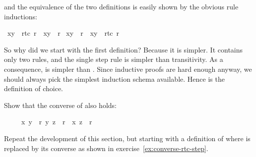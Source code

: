 \begin{isabellebody}
%
\begin{isamarkuptext}%
\noindent
and the equivalence of the two definitions is easily shown by the obvious rule
inductions:%
\end{isamarkuptext}%
\isamarkuptrue%
\ {\isachardoublequote}{\isacharparenleft}x{\isacharcomma}y{\isacharparenright}\ {\isasymin}\ rtc{}\ r\ {\isasymLongrightarrow}\ {\isacharparenleft}x{\isacharcomma}y{\isacharparenright}\ {\isasymin}\ r{\isacharasterisk}{\isachardoublequote}\isanewline
\isamarkupfalse%
\isamarkupfalse%
\isamarkupfalse%
\isamarkupfalse%
\isamarkupfalse%
\isanewline
\isanewline
\isamarkupfalse%
\ {\isachardoublequote}{\isacharparenleft}x{\isacharcomma}y{\isacharparenright}\ {\isasymin}\ r{\isacharasterisk}\ {\isasymLongrightarrow}\ {\isacharparenleft}x{\isacharcomma}y{\isacharparenright}\ {\isasymin}\ rtc{}\ r{\isachardoublequote}\isanewline
\isamarkupfalse%
\isamarkupfalse%
\isamarkupfalse%
\isamarkupfalse%
\isamarkupfalse%
%
\begin{isamarkuptext}%
So why did we start with the first definition? Because it is simpler. It
contains only two rules, and the single step rule is simpler than
transitivity.  As a consequence,  is simpler than
. Since inductive proofs are hard enough
anyway, we should always pick the simplest induction schema available.
Hence  is the definition of choice.

\begin{exercise}\label{ex:converse-rtc-step}
Show that the converse of  also holds:
\begin{isabelle}%
\ \ \ \ \ {\isasymlbrakk}{\isacharparenleft}x{\isacharcomma}\ y{\isacharparenright}\ {\isasymin}\ r{\isacharasterisk}{\isacharsemicolon}\ {\isacharparenleft}y{\isacharcomma}\ z{\isacharparenright}\ {\isasymin}\ r{\isasymrbrakk}\ {\isasymLongrightarrow}\ {\isacharparenleft}x{\isacharcomma}\ z{\isacharparenright}\ {\isasymin}\ r{\isacharasterisk}%
\end{isabelle}
\end{exercise}
\begin{exercise}
Repeat the development of this section, but starting with a definition of
 where  is replaced by its converse as shown
in exercise~\ref{ex:converse-rtc-step}.
\end{exercise}%
\end{isamarkuptext}%
\isamarkuptrue%
\isamarkupfalse%
\isamarkupfalse%
\isamarkupfalse%
\isamarkupfalse%
\isamarkupfalse%
\isamarkupfalse%
\end{isabellebody}%
